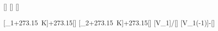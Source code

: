 [\meter\cubed]
[\degreeCelsius]
[\degreeCelsius]

[\vartheta_1+\SI{273.15}{\kelvin}]{\thEiX+273.15}[\kelvin]
[\vartheta_2+\SI{273.15}{\kelvin}]{\thZwX+273.15}[\kelvin]
[V_1\cdot{}]{\VzX*\TZwX/\TEiX}[\meter\cubed]
[V_1\left(-1\right)]{\VzZX-\VzX}[\meter\cubed]
